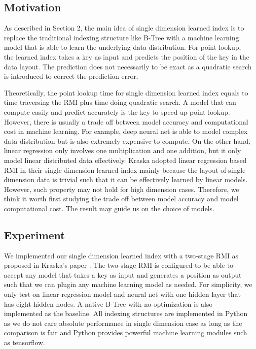 \documentclass[sigconf,10pt]{acmart}
\begin{document}
\subsection{Motivation}

As described in Section 2, the main idea of single dimension learned index is to replace
the traditional indexing structure like B-Tree with a machine learning model that is able
to learn the underlying data distribution. For point lookup, the learned index takes a key
as input and predicts the position of the key in the data layout. The prediction does not
necessarily to be exact as a quadratic search is introduced to correct the prediction error.

Theoretically, the point lookup time for single dimension learned index equals to time
traversing the RMI plus time doing quadratic search. A model that can compute easily and predict
accurately is the key to speed up point lookup. However, there is usually a trade off between
model accuracy and computational cost in machine learning. For example, deep neural net is able
to model complex data distribution but is also extremely expensive to compute. On the other hand,
linear regression only involves one multiplication and one addition, but it only model linear
distributed data effectively. Kraska adopted linear regression based RMI in their single dimension
learned index mainly because the layout of single dimension data is trivial such that it can be
effectively learned by linear models. However, such property may not hold for high dimension cases.
Therefore, we think it worth first studying the trade off between model accuracy and model
computational cost. The result may guide us on the choice of models. 

\subsection{Experiment}

We implemented our single dimension learned index with a two-stage RMI as proposed in 
Kraska's paper \cite{Learned_Index}. The two-stage RMI is configured to be able to accept
any model that takes a key as input and generates a position as output such that we can
plugin any machine learning model as needed. For simplicity, we only test on linear regression
model and neural net with one hidden layer that has eight hidden nodes. A native B-Tree with no optimization is also implemented
as the baseline. All indexing structures are implemented in Python as we do not care absolute
performance in single dimension case as long as the comparison is fair and Python provides powerful
machine learning modules such as tensorflow. 
\end{document}

